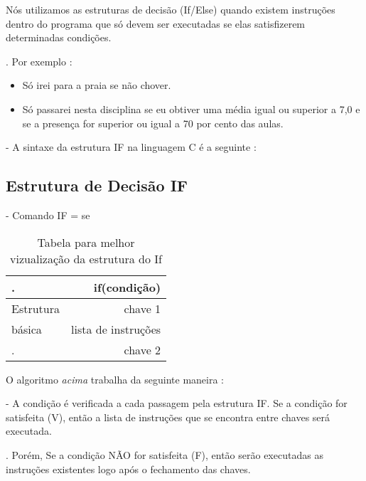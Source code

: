 \documentclass[a4paper,10pt]{article}  %
\begin{document}
   Nós utilizamos as estruturas de decisão (If/Else) quando existem instruções
dentro do programa que só devem ser executadas se elas satisfizerem  
determinadas condições.


  . Por exemplo :

\begin{itemize}
               
       \item  Só irei para a praia se não chover. 
       \item  Só passarei nesta disciplina se eu obtiver uma média igual ou superior a 7,0 e se a presença for superior ou igual a 70 por cento das aulas.
             
\end{itemize}

   -  A sintaxe da estrutura IF na linguagem C é a seguinte :
 
 \subsection{Estrutura de Decisão IF}   
       
 - Comando IF = se


\begin{table}
\begin{center}
 \caption{Tabela para melhor vizualização da estrutura do If}
\begin{tabular}{|l|r|}
  \hline \hline
  
  .          & if(condição) \\ \hline
  Estrutura  & chave 1  \\ \hline
    básica   &   lista de instruções  \\ \hline
  .          & chave 2  \\ \hline
  
\end{tabular}
\label{tab:resultados}
\end{center}
\end{table}

 O algoritmo \textit{acima} trabalha da seguinte maneira :
 
  - A condição é verificada a cada passagem pela estrutura IF. Se a condição for satisfeita (V), então a lista de instruções que se encontra entre chaves será executada.

.
 Porém, Se a condição NÃO for satisfeita (F), então serão executadas as instruções existentes logo após o fechamento das chaves.


\end{document}
